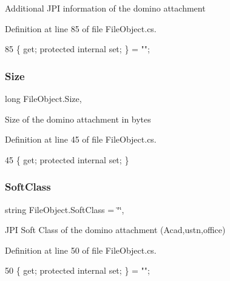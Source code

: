 Additional J\+PI information of the domino attachment 



Definition at line 85 of file File\+Object.\+cs.


\begin{DoxyCode}
85 \{ \textcolor{keyword}{get}; \textcolor{keyword}{protected} \textcolor{keyword}{internal} \textcolor{keyword}{set}; \} = \textcolor{stringliteral}{""};
\end{DoxyCode}
\mbox{\label{class_file_object_a7aa7737c1ce05f4424ba16dded444949}} 
\subsubsection{\texorpdfstring{Size}{Size}}
{\footnotesize\ttfamily long File\+Object.\+Size\hspace{0.3cm}{\ttfamily [get]}, {\ttfamily [set]}}



Size of the domino attachment in bytes 



Definition at line 45 of file File\+Object.\+cs.


\begin{DoxyCode}
45 \{ \textcolor{keyword}{get}; \textcolor{keyword}{protected} \textcolor{keyword}{internal} \textcolor{keyword}{set}; \}
\end{DoxyCode}
\mbox{\label{class_file_object_a5e9b8f083b53ea0450a0560c16292a2f}} 
\subsubsection{\texorpdfstring{Soft\+Class}{SoftClass}}
{\footnotesize\ttfamily string File\+Object.\+Soft\+Class = \char`\"{}\char`\"{}\hspace{0.3cm}{\ttfamily [get]}, {\ttfamily [set]}}



J\+PI Soft Class of the domino attachment (Acad,ustn,office) 



Definition at line 50 of file File\+Object.\+cs.


\begin{DoxyCode}
50 \{ \textcolor{keyword}{get}; \textcolor{keyword}{protected} \textcolor{keyword}{internal} \textcolor{keyword}{set}; \} = \textcolor{stringliteral}{""};
\end{DoxyCode}
\mbox{\label{class_file_object_a7355eaeea3fe40bd8862d7f1f9b479da}} 
